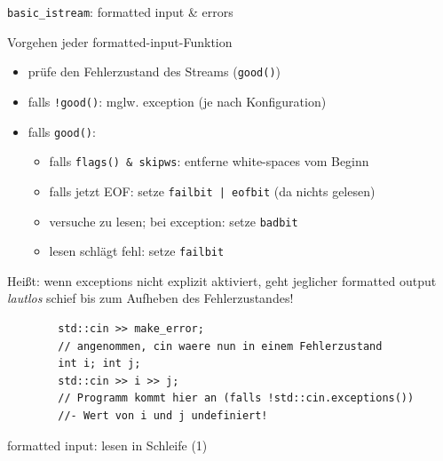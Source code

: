 \begin{frame}[fragile]{\texttt{basic\_istream}: formatted input \& errors}
	\begin{block}{Vorgehen jeder formatted-input-Funktion}
		\begin{itemize}
			\item prüfe den Fehlerzustand des Streams (\texttt{good()})
			\item falls \texttt{!good()}: mglw. exception (je nach Konfiguration)
			\item falls \texttt{good()}:
				\begin{itemize}
					\item falls \texttt{flags() \& skipws}: entferne white-spaces vom Beginn
					\item falls jetzt EOF: setze \texttt{failbit | eofbit} (da nichts gelesen)
					\item versuche zu lesen; bei exception: setze \texttt{badbit}
					\item lesen schlägt fehl: setze \texttt{failbit}
				\end{itemize}
		\end{itemize}
	\end{block}
	
	\pause
	
	\footnotesize
	
	Heißt: wenn exceptions nicht explizit aktiviert, geht jeglicher formatted output \emph{lautlos} schief bis zum Aufheben des Fehlerzustandes!
	
	\begin{lstlisting}
		std::cin >> make_error;
		// angenommen, cin waere nun in einem Fehlerzustand
		int i; int j;
		std::cin >> i >> j;
		// Programm kommt hier an (falls !std::cin.exceptions())
		//- Wert von i und j undefiniert!
	\end{lstlisting}
\end{frame}

\begin{frame}[t]{formatted input: lesen in Schleife (1)}
	\begin{columns}[t]
		\hspace{2em}
			\onslide*<+> {  }
			\onslide<+-> {  }
			
		\column{0.5\textwidth}
			\vspace{2.25em}
			\onslide*<+> {  }
			\onslide<+-> {  }
	\end{columns}
\end{frame}

